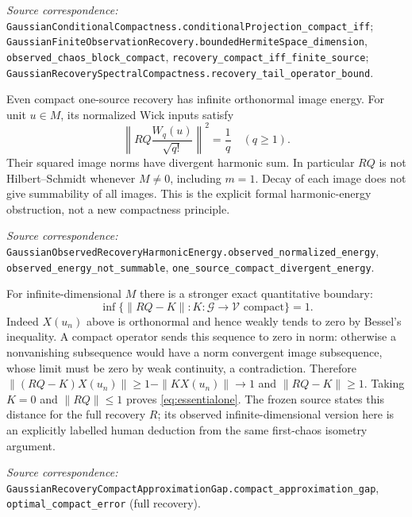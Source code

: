\documentclass[11pt]{article}
\newcommand{\code}[1]{{\small\nolinkurl{#1}}}
\begin{document}
\par\smallskip\begingroup\small\raggedright
\textit{Source correspondence:} \code{GaussianConditionalCompactness.conditionalProjection_compact_iff};
\code{GaussianFiniteObservationRecovery.boundedHermiteSpace_dimension},
\code{observed_chaos_block_compact}, \code{recovery_compact_iff_finite_source};
\code{GaussianRecoverySpectralCompactness.recovery_tail_operator_bound}.
\par\endgroup

Even compact one-source recovery has infinite orthonormal image energy.
For unit $u\in M$, its normalized Wick inputs satisfy
\[
 \left\|RQ\frac{W_q(u)}{\sqrt{q!}}\right\|^2=\frac1q\quad(q\geq1).
\]
Their squared image norms have divergent harmonic sum. In particular
$RQ$ is not Hilbert--Schmidt whenever $M\ne0$, including $m=1$.
Decay of each image does not give summability of all images. This is
the explicit formal harmonic-energy obstruction, not a new compactness
principle.
\par\smallskip\begingroup\small\raggedright
\textit{Source correspondence:} \code{GaussianObservedRecoveryHarmonicEnergy.observed_normalized_energy},
\code{observed_energy_not_summable}, \code{one_source_compact_divergent_energy}.
\par\endgroup

For infinite-dimensional $M$ there is a stronger exact quantitative
boundary:
\begin{equation}\label{eq:essentialone}
 \inf\{\|RQ-K\|:K:\mathcal G\to\mathcal V\text{ compact}\}=1.
\end{equation}
Indeed $X(u_n)$ above is orthonormal and hence weakly tends to zero
by Bessel's inequality. A compact operator sends this sequence to zero
in norm: otherwise a nonvanishing subsequence would have a norm
convergent image subsequence, whose limit must be zero by weak
continuity, a contradiction. Therefore
$\|(RQ-K)X(u_n)\|\geq1-\|KX(u_n)\|\to1$ and $\|RQ-K\|\geq1$.
Taking $K=0$ and $\|RQ\|\leq1$ proves \eqref{eq:essentialone}.
The frozen source states this distance for the full recovery $R$;
its observed infinite-dimensional version here is an explicitly labelled
human deduction from the same first-chaos isometry argument.
\par\smallskip\begingroup\small\raggedright
\textit{Source correspondence:} \code{GaussianRecoveryCompactApproximationGap.compact_approximation_gap},
\code{optimal_compact_error} (full recovery).
\par\endgroup
\end{document}
